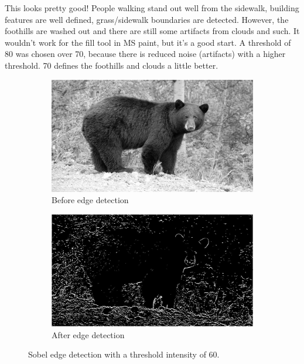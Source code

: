 \documentclass[11pt,a4paper]{article}
\begin{document}
This looks pretty good! People walking stand out well from the sidewalk, building features are well defined, grass/sidewalk boundaries are detected. However, the foothills are washed out and there are still some artifacts from clouds and such. It wouldn't work for the fill tool in MS paint, but it's a good start. A threshold of 80 was chosen over 70, because there is reduced noise (artifacts) with a higher threshold. 70 defines the foothills and clouds a little better.

\pagebreak

\begin{figure}[ht]
	\centering
	\begin{subfigure}[h]{0.75\textwidth}
		\includegraphics[width=\textwidth]{figs/test02_gray}
		\caption{Before edge detection}
		\label{fig:test02_gray}
	\end{subfigure}
	\par
	\begin{subfigure}[h]{0.75\textwidth}
		\includegraphics[width=\textwidth]{figs/test02_edges}
		\caption{After edge detection}
		\label{fig:test02_edge}
	\end{subfigure}
	
	\caption{Sobel edge detection with a threshold intensity of 60.}
	\label{fig:edge02}
\end{figure}
\end{document}
